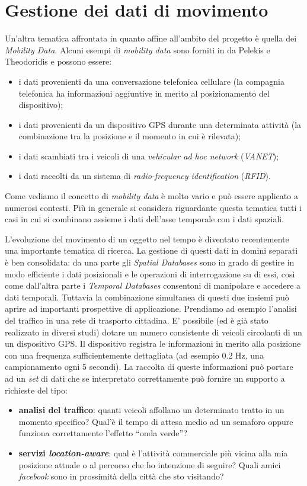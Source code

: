 \section{Gestione dei dati di movimento}
Un'altra tematica affrontata in quanto affine all'ambito del progetto è quella dei \emph{Mobility Data}. Alcuni esempi di \emph{mobility data} sono forniti in \cite{mdme} da Pelekis e Theodoridis e possono essere:
\begin{itemize}
  \item i dati provenienti da una conversazione telefonica cellulare (la compagnia telefonica ha informazioni aggiuntive in merito al posizionamento del dispositivo);
  \item i dati provenienti da un dispositivo GPS durante una determinata attività (la combinazione tra la posizione e il momento in cui è rilevata);
  \item i dati scambiati tra i veicoli di una \emph{vehicular ad hoc network} (\emph{VANET});
  \item i dati raccolti da un sistema di \emph{radio-frequency identification} (\emph{RFID}).
\end{itemize}
Come vediamo il concetto di \emph{mobility data} è molto vario e può essere applicato a numerosi contesti. Più in generale si considera riguardante questa tematica tutti i casi in cui si combinano assieme i dati dell'asse temporale con i dati spaziali. 

L'evoluzione del movimento di un oggetto nel tempo è diventato recentemente una importante tematica di ricerca. La gestione di questi dati in domini separati è ben consolidata: da una parte gli \emph{Spatial Databases} sono in grado di gestire in modo efficiente i dati posizionali e le operazioni di interrogazione su di essi, così come dall'altra parte i \emph{Temporal Databases} consentoni di manipolare e accedere a dati temporali. Tuttavia la combinazione simultanea di questi due insiemi può aprire ad importanti prospettive di applicazione. Prendiamo ad esempio l'analisi del traffico in una rete di trasporto cittadina. E' possibile (ed è già stato realizzato in diversi studi) dotare un numero consistente di veicoli circolanti di un un dispositivo GPS. Il dispositivo registra le informazioni in merito alla posizione con una frequenza sufficientemente dettagliata (ad esempio 0.2 Hz, una campionamento ogni 5 secondi). La raccolta di queste informazioni può portare ad un \emph{set} di dati che se interpretato correttamente può fornire un supporto a richieste del tipo:
\begin{itemize}
  \item \textbf{analisi del traffico}: quanti veicoli affollano un determinato tratto in un momento specifico? Qual'è il tempo di attesa medio ad un semaforo oppure funziona correttamente l'effetto ``onda verde''?
  \item \textbf{servizi \emph{location-aware}}: qual è l'attività commerciale più vicina alla mia posizione attuale o al percorso che ho intenzione di seguire? Quali amici \emph{facebook} sono in prossimità della città che sto visitando?
\end{itemize}

